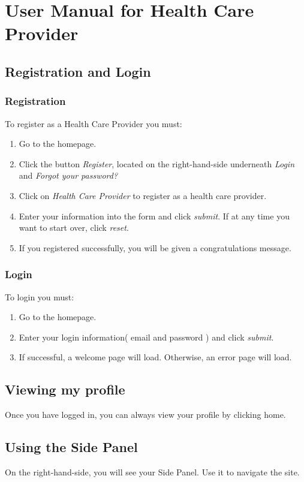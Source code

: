 \chapter{User Manual for Health Care Provider}

\section{Registration and Login}
\subsection{Registration}
To register as a Health Care Provider you must:
\begin{enumerate}
\item Go to the homepage.
\item Click the button \textit{Register}, located on the right-hand-side underneath \textit{Login} and \textit{Forgot your password?}
\item Click on \textit{Health Care Provider} to register as a health care provider.
\item Enter your information into the form and click \textit{submit}. If at any time you want to start over, click \textit{reset}.
\item If you registered successfully, you will be given a congratulations message.
\end{enumerate}
\subsection{Login}
To login you must:
\begin{enumerate}
\item Go to the homepage.
\item Enter your login information( email and password ) and click \textit{submit}.
\item If successful, a welcome page will load. Otherwise, an error page will load. 
\end{enumerate}

\section{Viewing my profile}
Once you have logged in, you can always view your profile by clicking home.

\section{Using the Side Panel}
On the right-hand-side, you will see your Side Panel. Use it to navigate the site.

